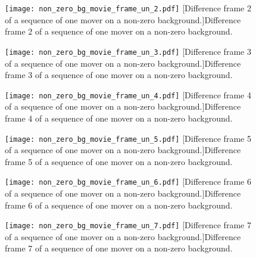 \begin{figure}[!ht]
	\centering
	\texttt{[image: non\_zero\_bg\_movie\_frame\_un\_2.pdf]}
	[Difference frame 2 of a sequence of one mover on a non-zero background.]{Difference frame 2 of a sequence of one mover on a non-zero background.}
	\label{fig:non_zero_bg_movie_frame_un_2}
\end{figure}

\begin{figure}[!ht]
	\centering
	\texttt{[image: non\_zero\_bg\_movie\_frame\_un\_3.pdf]}
	[Difference frame 3 of a sequence of one mover on a non-zero background.]{Difference frame 3 of a sequence of one mover on a non-zero background.}
	\label{fig:non_zero_bg_movie_frame_un_3}
\end{figure}

\clearpage

\begin{figure}[!ht]
	\centering
	\texttt{[image: non\_zero\_bg\_movie\_frame\_un\_4.pdf]}
	[Difference frame 4 of a sequence of one mover on a non-zero background.]{Difference frame 4 of a sequence of one mover on a non-zero background.}
	\label{fig:non_zero_bg_movie_frame_un_4}
\end{figure}

\begin{figure}[!ht]
	\centering
	\texttt{[image: non\_zero\_bg\_movie\_frame\_un\_5.pdf]}
	[Difference frame 5 of a sequence of one mover on a non-zero background.]{Difference frame 5 of a sequence of one mover on a non-zero background.}
	\label{fig:non_zero_bg_movie_frame_un_5}
\end{figure}

\begin{figure}[!ht]
	\centering
	\texttt{[image: non\_zero\_bg\_movie\_frame\_un\_6.pdf]}
	[Difference frame 6 of a sequence of one mover on a non-zero background.]{Difference frame 6 of a sequence of one mover on a non-zero background.}
	\label{fig:non_zero_bg_movie_frame_un_6}
\end{figure}

\clearpage

\begin{figure}[!ht]
	\centering
	\texttt{[image: non\_zero\_bg\_movie\_frame\_un\_7.pdf]}
	[Difference frame 7 of a sequence of one mover on a non-zero background.]{Difference frame 7 of a sequence of one mover on a non-zero background.}
	\label{fig:non_zero_bg_movie_frame_un_7}
\end{figure}

